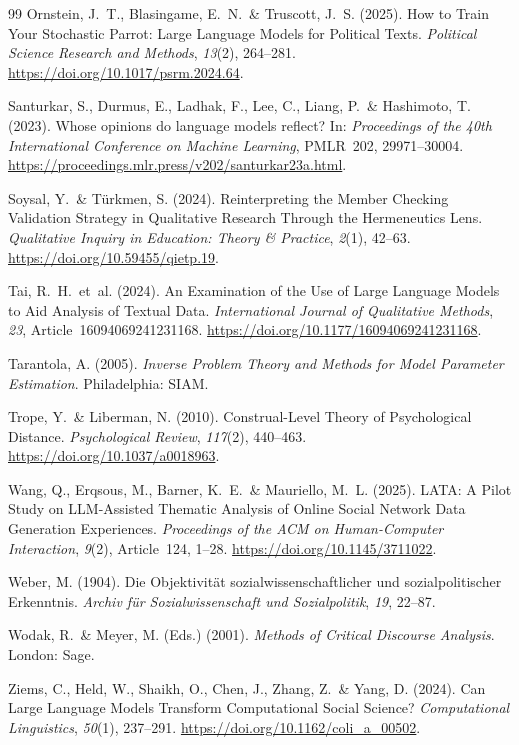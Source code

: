 \documentclass[11pt,a4paper]{article}
\begin{document}
\begin{thebibliography}{99}
  Ornstein, J.~T., Blasingame, E.~N.~\& Truscott, J.~S. (2025).
  How to Train Your Stochastic Parrot: Large Language Models for Political Texts.
  \textit{Political Science Research and Methods}, \textit{13}(2), 264--281. \url{https://doi.org/10.1017/psrm.2024.64}.

  Santurkar, S., Durmus, E., Ladhak, F., Lee, C., Liang, P.~\& Hashimoto, T. (2023).
  Whose opinions do language models reflect?
  In: \textit{Proceedings of the 40th International Conference on Machine Learning}, PMLR~202, 29971--30004. \url{https://proceedings.mlr.press/v202/santurkar23a.html}.

  Soysal, Y.~\& Türkmen, S. (2024).
  Reinterpreting the Member Checking Validation Strategy in Qualitative Research Through the Hermeneutics Lens.
  \textit{Qualitative Inquiry in Education: Theory \& Practice}, \textit{2}(1), 42--63. \url{https://doi.org/10.59455/qietp.19}.

  Tai, R.~H.~et~al. (2024).
  An Examination of the Use of Large Language Models to Aid Analysis of Textual Data.
  \textit{International Journal of Qualitative Methods}, \textit{23}, Article~16094069241231168. \url{https://doi.org/10.1177/16094069241231168}.

  Tarantola, A. (2005).
  \textit{Inverse Problem Theory and Methods for Model Parameter Estimation}.
  Philadelphia: SIAM.

  Trope, Y.~\& Liberman, N. (2010).
  Construal-Level Theory of Psychological Distance.
  \textit{Psychological Review}, \textit{117}(2), 440--463. \url{https://doi.org/10.1037/a0018963}.

  Wang, Q., Erqsous, M., Barner, K.~E.~\& Mauriello, M.~L. (2025).
  LATA: A Pilot Study on LLM-Assisted Thematic Analysis of Online Social Network Data Generation Experiences.
  \textit{Proceedings of the ACM on Human-Computer Interaction}, \textit{9}(2), Article~124, 1--28. \url{https://doi.org/10.1145/3711022}.

  Weber, M. (1904).
  Die \glqq{}Objektivität\grqq{} sozialwissenschaftlicher und sozialpolitischer Erkenntnis.
  \textit{Archiv für Sozialwissenschaft und Sozialpolitik}, \textit{19}, 22--87.

  Wodak, R.~\& Meyer, M. (Eds.) (2001).
  \textit{Methods of Critical Discourse Analysis}.
  London: Sage.

  Ziems, C., Held, W., Shaikh, O., Chen, J., Zhang, Z.~\& Yang, D. (2024).
  Can Large Language Models Transform Computational Social Science?
  \textit{Computational Linguistics}, \textit{50}(1), 237--291. \url{https://doi.org/10.1162/coli_a_00502}.

\end{thebibliography}
\end{document}
